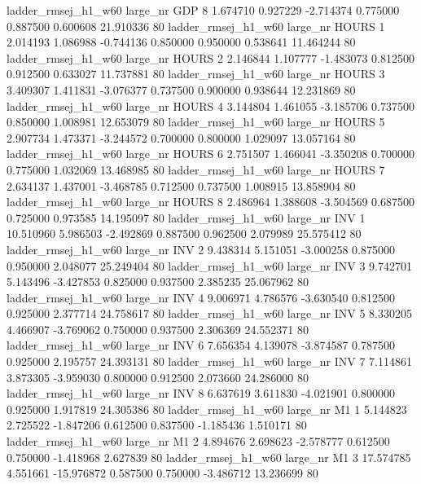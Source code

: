 ladder_rmsej_h1_w60   large_nr      GDP                 8  1.674710  0.927229  -2.714374 0.775000 0.887500  0.600608   21.910336 80
ladder_rmsej_h1_w60   large_nr    HOURS                 1  2.014193  1.086988  -0.744136 0.850000 0.950000  0.538641   11.464244 80
ladder_rmsej_h1_w60   large_nr    HOURS                 2  2.146844  1.107777  -1.483073 0.812500 0.912500  0.633027   11.737881 80
ladder_rmsej_h1_w60   large_nr    HOURS                 3  3.409307  1.411831  -3.076377 0.737500 0.900000  0.938644   12.231869 80
ladder_rmsej_h1_w60   large_nr    HOURS                 4  3.144804  1.461055  -3.185706 0.737500 0.850000  1.008981   12.653079 80
ladder_rmsej_h1_w60   large_nr    HOURS                 5  2.907734  1.473371  -3.244572 0.700000 0.800000  1.029097   13.057164 80
ladder_rmsej_h1_w60   large_nr    HOURS                 6  2.751507  1.466041  -3.350208 0.700000 0.775000  1.032069   13.468985 80
ladder_rmsej_h1_w60   large_nr    HOURS                 7  2.634137  1.437001  -3.468785 0.712500 0.737500  1.008915   13.858904 80
ladder_rmsej_h1_w60   large_nr    HOURS                 8  2.486964  1.388608  -3.504569 0.687500 0.725000  0.973585   14.195097 80
ladder_rmsej_h1_w60   large_nr      INV                 1 10.510960  5.986503  -2.492869 0.887500 0.962500  2.079989   25.575412 80
ladder_rmsej_h1_w60   large_nr      INV                 2  9.438314  5.151051  -3.000258 0.875000 0.950000  2.048077   25.249404 80
ladder_rmsej_h1_w60   large_nr      INV                 3  9.742701  5.143496  -3.427853 0.825000 0.937500  2.385235   25.067962 80
ladder_rmsej_h1_w60   large_nr      INV                 4  9.006971  4.786576  -3.630540 0.812500 0.925000  2.377714   24.758617 80
ladder_rmsej_h1_w60   large_nr      INV                 5  8.330205  4.466907  -3.769062 0.750000 0.937500  2.306369   24.552371 80
ladder_rmsej_h1_w60   large_nr      INV                 6  7.656354  4.139078  -3.874587 0.787500 0.925000  2.195757   24.393131 80
ladder_rmsej_h1_w60   large_nr      INV                 7  7.114861  3.873305  -3.959030 0.800000 0.912500  2.073660   24.286000 80
ladder_rmsej_h1_w60   large_nr      INV                 8  6.637619  3.611830  -4.021901 0.800000 0.925000  1.917819   24.305386 80
ladder_rmsej_h1_w60   large_nr       M1                 1  5.144823  2.725522  -1.847206 0.612500 0.837500 -1.185436    1.510171 80
ladder_rmsej_h1_w60   large_nr       M1                 2  4.894676  2.698623  -2.578777 0.612500 0.750000 -1.418968    2.627839 80
ladder_rmsej_h1_w60   large_nr       M1                 3 17.574785  4.551661 -15.976872 0.587500 0.750000 -3.486712   13.236699 80
